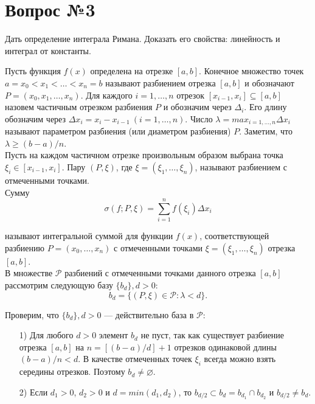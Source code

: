 \documentclass[12pt]{article}
\numberwithin{equation}{section}
\begin{document}
\newpage

\section{Вопрос №3}  %
\begin{framed}Дать определение интеграла Римана. Доказать его свойства: линейность и интеграл от константы.
\end{framed}

Пусть функция $f(x)$ определена на отрезке $[a,b]$. Конечное множество точек $a = x_0 < x_1 < \ldots < x_n = b$ называют разбиением отрезка $[a,b]$ и обозначают $P = (x_0, x_1, \ldots, x_n)$. Для каждого $i = 1, \ldots, n$ отрезок $[x_{i-1}, x_i] \subseteq [a,b]$ назовем частичным отрезком разбиения $P$ и обозначим через $\Delta_i$. Его длину обозначим через $\Delta x_i = x_i - x_{i-1}~(i = 1, \ldots, n)$. Число $\lambda = max_{i = 1, \ldots, n}\Delta x_i $ называют параметром разбиения (или диаметром разбиения) $P$. Заметим, что $\lambda \geqslant (b-a)/n$.\\

Пусть на каждом частичном отрезке произвольным образом выбрана точка $\xi_i \in [x_{i-1}, x_i]$. Пару $(P, \xi)$, где $\xi = (\xi_1, \ldots, \xi_n)$, называют разбиением с отмеченными точками.\\

Сумму 
\[ \sigma(f;P, \xi) = \sum\limits_{i=1}^{n}f(\xi_i)\Delta x_i\]

называют интегральной суммой для функции $f(x)$, соответствующей разбиению $P = (x_0, \ldots, x_n)$ с отмеченными точками $\xi = (\xi_1, \ldots, \xi_n)$ отрезка $[a,b]$.\\

В множестве $\mathcal{P}$ разбиений с отмеченными точками данного отрезка $[a,b]$ рассмотрим следующую базу $\{b_d\}, d> 0:$
\[ b_d = \{ (P, \xi) \in \mathcal{P} : \lambda < d\}.\]

Проверим, что $\{b_d\}, d> 0$ --- действительно база в $\mathcal{P}$:
\begin{enumerate}
\item [1)] Для любого $d > 0$ элемент $b_d$ не пуст, так как существует разбиение отрезка $[a,b]$ на $n = [(b-a)/d] +1$ отрезков одинаковой длины $(b-a)/n <d$. В качестве отмеченных точек $\xi_i$ всегда можно взять середины отрезков. Поэтому $b_d \neq \varnothing$.
\item [2)] Если $d_1 >0$, $d_2 > 0$ и $d = min(d_1,d_2)$, то $b_{d/2} \subset b_d = b_{d_1} \cap b_{d_2}$ и $b_{d/2} \neq b_d$.
\end{enumerate}
\end{document}
